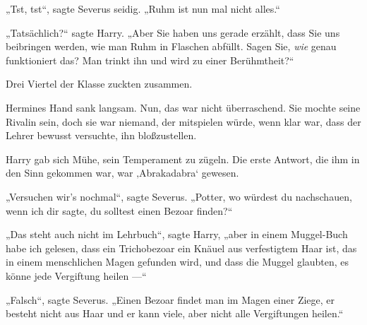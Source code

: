 „Tst, tst“, sagte Severus seidig.
„Ruhm ist nun mal nicht alles.“

„Tatsächlich?“ sagte Harry.
„Aber Sie haben uns gerade erzählt, dass Sie uns beibringen werden, wie man Ruhm in Flaschen abfüllt. Sagen Sie, \emph{wie} genau funktioniert das? Man trinkt ihn und wird zu einer Berühmtheit?“

Drei Viertel der Klasse zuckten zusammen.

Hermines Hand sank langsam. Nun, das war nicht überraschend. Sie mochte seine Rivalin sein, doch sie war niemand, der mitspielen würde, wenn klar war, dass der Lehrer bewusst versuchte, ihn bloßzustellen.

Harry gab sich Mühe, sein Temperament zu zügeln. Die erste Antwort, die ihm in den Sinn gekommen war, war ‚Abrakadabra‘ gewesen.

„Versuchen wir’s nochmal“, sagte Severus.
„Potter, wo würdest du nachschauen, wenn ich dir sagte, du solltest einen Bezoar finden?“

„Das steht auch nicht im Lehrbuch“, sagte Harry, „aber in einem Muggel-Buch habe ich gelesen, dass ein Trichobezoar ein Knäuel aus verfestigtem Haar ist, das in einem menschlichen Magen gefunden wird, und dass die Muggel glaubten, es könne jede Vergiftung heilen —“ %

„Falsch“, sagte Severus.
„Einen Bezoar findet man im Magen einer Ziege, er besteht nicht aus Haar und er kann viele, aber nicht alle Vergiftungen heilen.“

